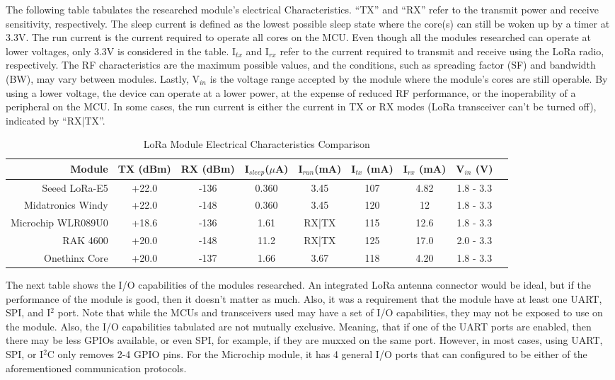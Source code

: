 The following table tabulates the researched module's electrical
Characteristics. ``TX'' and ``RX'' refer to the transmit power and receive
sensitivity, respectively. The sleep current is defined as the lowest possible
sleep state where the core(s) can still be woken up by a timer at 3.3V. The run
current is the current required to operate all cores on the MCU. Even though all
the modules researched can operate at lower voltages, only 3.3V is considered in
the table. I$_{tx}$ and I$_{rx}$ refer to the current required to transmit and
receive using the LoRa radio, respectively.  The RF characteristics are the
maximum possible values, and the conditions, such as spreading factor (SF) and
bandwidth (BW), may vary between modules.  Lastly, V$_{in}$ is the voltage range
accepted by the module where the module's cores are still operable. By using a
lower voltage, the device can operate at a lower power, at the expense of
reduced RF performance, or the inoperability of a peripheral on the MCU. In some
cases, the run current is either the current in TX or RX modes (LoRa transceiver
can't be turned off), indicated by ``RX|TX''.

\begin{table}[H]
\centering\scriptsize
\caption{LoRa Module Electrical Characteristics Comparison}
\begin{tabular}{|r|c|c|c|c|c|c|c|c|}
\hline
Module & TX (dBm) & RX (dBm) & I$_{sleep}$($\mu$A) & I$_{run}$(mA) & I$_{tx}$
(mA) & I$_{rx}$ (mA) &  V$_{in}$ (V) \\
\hline\hline

Seeed LoRa-E5       & +22.0 & -136  & 0.360   & 3.45    & 107 & 4.82  & 1.8 - 3.3 \\\hline
Midatronics Windy   & +22.0 & -148  & 0.360   & 3.45    & 120 & 12    & 1.8 - 3.3 \\\hline
Microchip WLR089U0  & +18.6 & -136  & 1.61    & RX|TX   & 115 & 12.6  & 1.8 - 3.3 \\\hline
RAK 4600            & +20.0 & -148  & 11.2    & RX|TX   & 125 & 17.0  & 2.0 - 3.3 \\\hline
Onethinx Core       & +20.0 & -137  & 1.66    & 3.67    & 118 & 4.20  & 1.8 - 3.3 \\\hline

\end{tabular}
\end{table}

The next table shows the I/O capabilities of the modules researched. An
integrated LoRa antenna connector would be ideal, but if the performance of the
module is good, then it doesn't matter as much. Also, it was a requirement that
the module have at least one UART, SPI, and I$^2$ port. Note that while the MCUs
and transceivers used may have a set of I/O capabilities, they may not be
exposed to use on the module. Also, the I/O capabilities tabulated are not
mutually exclusive. Meaning, that if one of the UART ports are enabled, then
there may be less GPIOs available, or even SPI, for example, if they are muxxed
on the same port. However, in most cases, using UART, SPI, or I$^2$C only
removes 2-4 GPIO pins. For the Microchip module, it has 4 general I/O ports that
can configured to be either of the aforementioned communication protocols.

